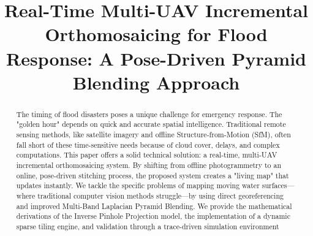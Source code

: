 \documentclass[conference]{IEEEtran}
\begin{document}
\title{Real-Time Multi-UAV Incremental Orthomosaicing for Flood Response: A Pose-Driven Pyramid Blending Approach}


\author{
\and
{}
}

\maketitle

\begin{abstract}
The timing of flood disasters poses a unique challenge for emergency response. The "golden hour" depends on quick and accurate spatial intelligence. Traditional remote sensing methods, like satellite imagery and offline Structure-from-Motion (SfM), often fall short of these time-sensitive needs because of cloud cover, delays, and complex computations. This paper offers a solid technical solution: a real-time, multi-UAV incremental orthomosaicing system. By shifting from offline photogrammetry to an online, pose-driven stitching process, the proposed system creates a "living map" that updates instantly. We tackle the specific problems of mapping moving water surfaces—where traditional computer vision methods struggle—by using direct georeferencing and improved Multi-Band Laplacian Pyramid Blending. We provide the mathematical derivations of the Inverse Pinhole Projection model, the implementation of a dynamic sparse tiling engine, and validation through a trace-driven simulation environment  
\end{abstract}
\end{document}
